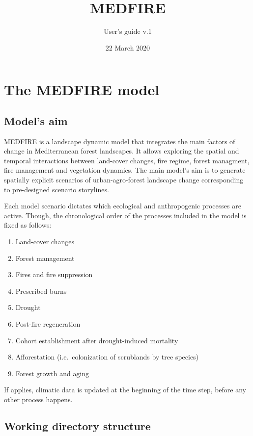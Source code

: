 \documentclass[
]{article}
\title{MEDFIRE}
\author{User's guide v.1}
\date{22 March 2020}
\begin{document}
\maketitle

\hypertarget{the-medfire-model}{%
\section{The MEDFIRE model}\label{the-medfire-model}}

\hypertarget{models-aim}{%
\subsection{Model's aim}\label{models-aim}}

MEDFIRE is a landscape dynamic model that integrates the main factors of
change in Mediterranean forest landscapes. It allows exploring the
spatial and temporal interactions between land-cover changes, fire
regime, forest managment, fire management and vegetation dynamics. The
main model's aim is to generate spatially explicit scenarios of
urban-agro-forest landscape change corresponding to pre-designed
scenario storylines.

Each model scenario dictates which ecological and anthropogenic
processes are active. Though, the chronological order of the processes
included in the model is fixed as follows:

\begin{enumerate}
\def\labelenumi{\arabic{enumi}.}
\item
  Land-cover changes
\item
  Forest management
\item
  Fires and fire suppression
\item
  Prescribed burns
\item
  Drought
\item
  Post-fire regeneration
\item
  Cohort establishment after drought-induced mortality
\item
  Afforestation (i.e.~colonization of scrublands by tree species)
\item
  Forest growth and aging
\end{enumerate}

If applies, climatic data is updated at the beginning of the time step,
before any other process happens.

\hypertarget{working-directory-structure}{%
\subsection{Working directory
structure}\label{working-directory-structure}}
\end{document}
